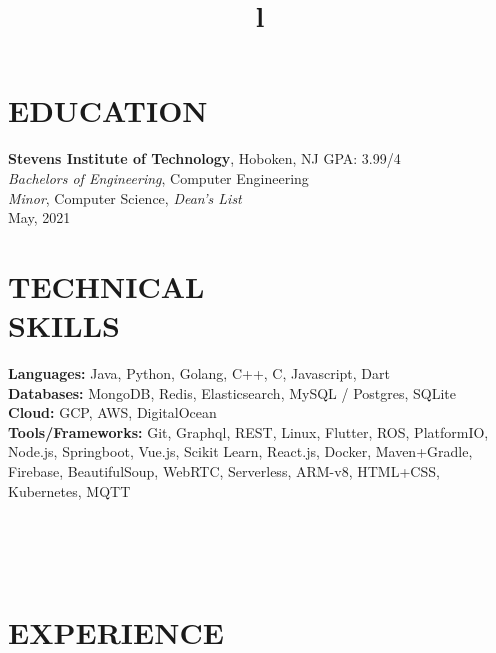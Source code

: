 \documentclass[margin]{res}
\begin{document}
\begin{resume}


\section{EDUCATION}
\textbf{Stevens Institute of Technology}, Hoboken, NJ \hfill GPA: 3.99/4\\
{\sl Bachelors of Engineering}, Computer Engineering\\
{\sl Minor}, Computer Science, {\sl Dean's List}\\
May, 2021

\section{TECHNICAL\\SKILLS}

\textbf{Languages:} Java, Python, Golang, C++, C, Javascript, Dart
\\
\textbf{Databases:} MongoDB, Redis, Elasticsearch, MySQL / Postgres, SQLite
\\
\textbf{Cloud:} GCP, AWS, DigitalOcean
\\
\textbf{Tools/Frameworks:} Git, Graphql, REST, Linux, Flutter, ROS, PlatformIO, Node.js,
Springboot, Vue.js, Scikit Learn, React.js, Docker, Maven+Gradle, Firebase, BeautifulSoup,
WebRTC, Serverless, ARM-v8, HTML+CSS, Kubernetes, MQTT

\begin{format}
\title{l}\\
\\
\body\\
\end{format}

\section{EXPERIENCE}


\end{resume}
\end{document}
